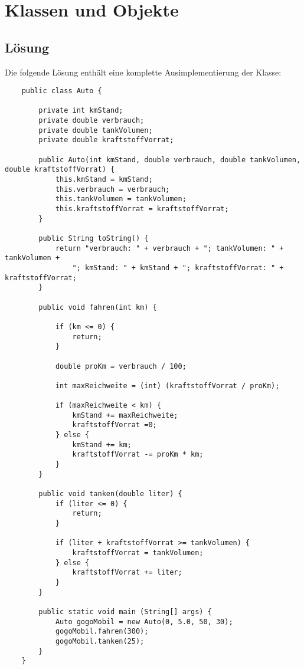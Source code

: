 \chapter{Klassen und Objekte}

\section{Lösung}

Die folgende Lösung enthält eine komplette Ausimplementierung der Klasse:

\begin{verbatim}
    public class Auto {

        private int kmStand;
        private double verbrauch;
        private double tankVolumen;
        private double kraftstoffVorrat;

        public Auto(int kmStand, double verbrauch, double tankVolumen, double kraftstoffVorrat) {
            this.kmStand = kmStand;
            this.verbrauch = verbrauch;
            this.tankVolumen = tankVolumen;
            this.kraftstoffVorrat = kraftstoffVorrat;
        }

        public String toString() {
            return "verbrauch: " + verbrauch + "; tankVolumen: " + tankVolumen +
                "; kmStand: " + kmStand + "; kraftstoffVorrat: " + kraftstoffVorrat;
        }

        public void fahren(int km) {

            if (km <= 0) {
                return;
            }

            double proKm = verbrauch / 100;

            int maxReichweite = (int) (kraftstoffVorrat / proKm);

            if (maxReichweite < km) {
                kmStand += maxReichweite;
                kraftstoffVorrat =0;
            } else {
                kmStand += km;
                kraftstoffVorrat -= proKm * km;
            }
        }

        public void tanken(double liter) {
            if (liter <= 0) {
                return;
            }

            if (liter + kraftstoffVorrat >= tankVolumen) {
                kraftstoffVorrat = tankVolumen;
            } else {
                kraftstoffVorrat += liter;
            }
        }

        public static void main (String[] args) {
            Auto gogoMobil = new Auto(0, 5.0, 50, 30);
            gogoMobil.fahren(300);
            gogoMobil.tanken(25);
        }
    }
\end{verbatim}\\

